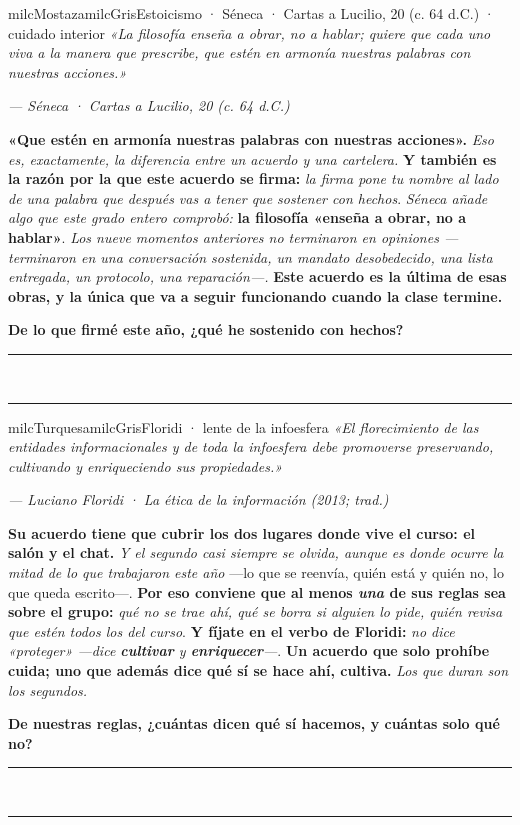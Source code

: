 \documentclass[11pt,letterpaper]{article}
\newcommand{\linead}[1]{\noindent\color{milcLinea}\rule{#1}{0.5pt}\color{milcNegro}}
\begin{document}
\begin{softbox}{milcMostaza}{milcGris}{Estoicismo · Séneca · Cartas a Lucilio, 20 (c. 64 d.C.) · cuidado interior}
\textit{«La filosofía enseña a obrar, no a hablar; quiere que cada uno viva a la manera que prescribe, que estén en armonía nuestras palabras con nuestras acciones.»}

{\footnotesize\itshape\color{milcNegro!70}--- Séneca · Cartas a Lucilio, 20 (c. 64 d.C.)}

\textbf{«Que estén en armonía nuestras palabras con nuestras acciones».} \emph{Eso es, exactamente, la diferencia entre un acuerdo y una cartelera.} \textbf{Y también es la razón por la que este acuerdo se firma:} \emph{la firma pone tu nombre al lado de una palabra que después vas a tener que sostener con hechos}. \emph{Séneca añade algo que este grado entero comprobó:} \textbf{la filosofía «enseña a obrar, no a hablar»}. \emph{Los nueve momentos anteriores no terminaron en opiniones ---terminaron en una conversación sostenida, un mandato desobedecido, una lista entregada, un protocolo, una reparación---.} \textbf{Este acuerdo es la última de esas obras, y la única que va a seguir funcionando cuando la clase termine.}

\textbf{De lo que firmé este año, ¿qué he sostenido con hechos?}
\end{softbox}
\linead{\linewidth}\\[1mm]
\linead{\linewidth}

\begin{softbox}{milcTurquesa}{milcGris}{Floridi · lente de la infoesfera}
\textit{«El florecimiento de las entidades informacionales y de toda la infoesfera debe promoverse preservando, cultivando y enriqueciendo sus propiedades.»}

{\footnotesize\itshape\color{milcNegro!70}--- Luciano Floridi · La ética de la información (2013; trad.)}

\textbf{Su acuerdo tiene que cubrir los dos lugares donde vive el curso: el salón y el chat.} \emph{Y el segundo casi siempre se olvida, aunque es donde ocurre la mitad de lo que trabajaron este año} ---lo que se reenvía, quién está y quién no, lo que queda escrito---. \textbf{Por eso conviene que al menos \emph{una} de sus reglas sea sobre el grupo:} \emph{qué no se trae ahí, qué se borra si alguien lo pide, quién revisa que estén todos los del curso}. \textbf{Y fíjate en el verbo de Floridi:} \emph{no dice «proteger» ---dice \textbf{cultivar} y \textbf{enriquecer}---}. \textbf{Un acuerdo que solo prohíbe cuida; uno que además dice qué sí se hace ahí, cultiva.} \emph{Los que duran son los segundos.}

\textbf{De nuestras reglas, ¿cuántas dicen qué sí hacemos, y cuántas solo qué no?}
\end{softbox}
\linead{\linewidth}\\[1mm]
\linead{\linewidth}
\end{document}
